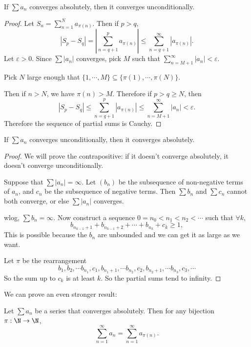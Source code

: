 \documentclass[a4paper]{article}
\begin{document}
\begin{thm}
  If $\sum a_n$ converges absolutely, then it converges unconditionally.
\end{thm}

\begin{proof}
  Let $S_n = \sum_{n = 1}^N a_{\pi (n)}$. Then if $p > q$,
  \[
    |S_p - S_q| = \left|\sum_{n = q + 1}^p a_{\pi(n)}\right| \leq \sum_{n = q + 1}^\infty|a_{\pi (n)}|.
  \]
  Let $\varepsilon > 0$. Since $\sum |a_n|$ converges, pick $M$ such that $\sum_{n = M + 1}^\infty|a_n| < \varepsilon$.

  Pick $N$ large enough that $\{1, \cdots, M\}\subseteq \{\pi (1), \cdots, \pi(N)\}$.

  Then if $n > N$, we have $\pi(n) > M$. Therefore if $p > q \geq N$, then
  \[
    |S_p - S_q| \leq \sum_{n = q + 1}^p |a_{\pi(n)}| \leq \sum_{n = M + 1}^\infty |a_n| < \varepsilon.
  \]
  Therefore the sequence of partial sums is Cauchy.
\end{proof}

\begin{thm}
  If $\sum a_n$ converges unconditionally, then it converges absolutely.
\end{thm}

\begin{proof}
  We will prove the contrapositive: if it doesn't converge absolutely, it doesn't converge unconditionally.

  Suppose that $\sum |a_n| = \infty$. Let $(b_n)$ be the subsequence of non-negative terms of $a_n$, and $c_n$ be the subsequence of negative terms. Then $\sum b_n$ and $\sum c_n$ cannot both converge, or else $\sum |a_n|$ converges.

  wlog, $\sum b_n = \infty$. Now construct a sequence $0 = n_0 < n_1 < n_2 < \cdots$ such that $\forall k$,
  \[
    b_{n_{k - 1} + 1} + b_{n_{k - 1} + 2} + \cdots + b_{n_k} + c_k \geq 1,
  \]
  This is possible because the $b_n$ are unbounded and we can get it as large as we want.

  Let $\pi$ be the rearrangement
  \[
    b_1, b_2, \cdots b_{n_1}, c_1, b_{n_1 + 1}, \cdots b_{n_2}, c_2, b_{n_2 + 1}, \cdots b_{n_3}, c_3,\cdots
  \]
  So the sum up to $c_k$ is at least $k$. So the partial sums tend to infinity.
\end{proof}

We can prove an even stronger result:
\begin{lemma}
 Let $\sum a_n$ be a series that converges absolutely. Then for any bijection $\pi: \N\to \N$,
 \[
   \sum_{n = 1}^\infty a_n = \sum_{n = 1}^\infty a_{\pi(n)}.
 \]
\end{lemma}
\end{document}
